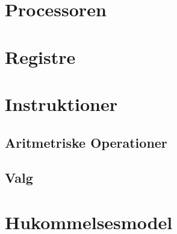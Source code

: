 \section{Processoren}

\section{Registre}

\section{Instruktioner}

\subsection{Aritmetriske Operationer}

\subsection{Valg}

\section{Hukommelsesmodel}

